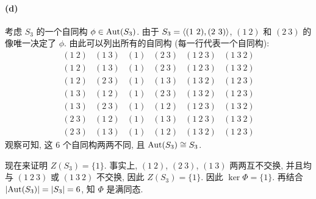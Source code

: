 \documentclass{article}
\begin{document}
\begin{solution}
	\paragraph{(d)} 考虑 $S_3$ 的一个自同构 $\phi \in \operatorname{Aut}(S_3)$. 由于 $S_3 = \left\langle (1\ 2), (2\ 3) \right\rangle$, $(1\ 2)$ 和 $(2\ 3)$ 的像唯一决定了 $\phi$. 由此可以列出所有的自同构 (每一行代表一个自同构): 
	\[ \begin{array}{cc|cccc}
		(1\ 2) & (1\ 3) & (1) & (2\ 3) & (1\ 2\ 3) & (1\ 3\ 2) \\ \hline
		(1\ 2) & (1\ 3) & (1) & (2\ 3) & (1\ 2\ 3) & (1\ 3\ 2) \\
		(1\ 2) & (2\ 3) & (1) & (1\ 3) & (1\ 3\ 2) & (1\ 2\ 3) \\
		(1\ 3) & (1\ 2) & (1) & (2\ 3) & (1\ 3\ 2) & (1\ 2\ 3) \\
		(1\ 3) & (2\ 3) & (1) & (1\ 2) & (1\ 2\ 3) & (1\ 3\ 2) \\
		(2\ 3) & (1\ 2) & (1) & (1\ 3) & (1\ 2\ 3) & (1\ 3\ 2) \\
		(2\ 3) & (1\ 3) & (1) & (1\ 2) & (1\ 3\ 2) & (1\ 2\ 3)
	\end{array} \]
	观察可知, 这 $6$ 个自同构两两不同, 且 $\operatorname{Aut}(S_3) \cong S_3$. 

	现在来证明 $Z(S_3) = \{1\}$. 事实上, $(1\ 2)$, $(2\ 3)$, $(1\ 3)$ 两两互不交换, 并且均与 $(1\ 2\ 3)$ 或 $(1\ 3\ 2)$ 不交换, 因此 $Z(S_3) = \{1\}$. 因此 $\ker \Phi = \{1\}$. 再结合 $\left|\operatorname{Aut}(S_3)\right| = \left|S_3\right| = 6$, 知 $\Phi$ 是满同态.
\end{solution}
\end{document}
